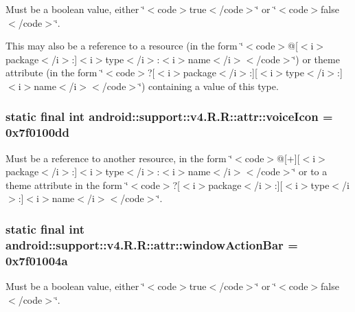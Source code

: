Must be a boolean value, either \char`\"{}$<$code$>$true$<$/code$>$\char`\"{} or \char`\"{}$<$code$>$false$<$/code$>$\char`\"{}. 

This may also be a reference to a resource (in the form \char`\"{}$<$code$>$@\mbox{[}$<$i$>$package$<$/i$>$:\mbox{]}$<$i$>$type$<$/i$>$:$<$i$>$name$<$/i$>$$<$/code$>$\char`\"{}) or theme attribute (in the form \char`\"{}$<$code$>$?\mbox{[}$<$i$>$package$<$/i$>$:\mbox{]}\mbox{[}$<$i$>$type$<$/i$>$:\mbox{]}$<$i$>$name$<$/i$>$$<$/code$>$\char`\"{}) containing a value of this type. \hypertarget{classandroid_1_1support_1_1v4_1_1_r_1_1attr_a308d75d002b6dfb8d612ca7faf303db}{
\subsubsection[{voiceIcon}]{\setlength{\rightskip}{0pt plus 5cm}static final int android::support::v4.R.R::attr::voiceIcon = 0x7f0100dd}}
\label{classandroid_1_1support_1_1v4_1_1_r_1_1attr_a308d75d002b6dfb8d612ca7faf303db}


Must be a reference to another resource, in the form \char`\"{}$<$code$>$@\mbox{[}+\mbox{]}\mbox{[}$<$i$>$package$<$/i$>$:\mbox{]}$<$i$>$type$<$/i$>$:$<$i$>$name$<$/i$>$$<$/code$>$\char`\"{} or to a theme attribute in the form \char`\"{}$<$code$>$?\mbox{[}$<$i$>$package$<$/i$>$:\mbox{]}\mbox{[}$<$i$>$type$<$/i$>$:\mbox{]}$<$i$>$name$<$/i$>$$<$/code$>$\char`\"{}. \hypertarget{classandroid_1_1support_1_1v4_1_1_r_1_1attr_a50eb8340be48311419382e35ced28bd}{
\subsubsection[{windowActionBar}]{\setlength{\rightskip}{0pt plus 5cm}static final int android::support::v4.R.R::attr::windowActionBar = 0x7f01004a}}
\label{classandroid_1_1support_1_1v4_1_1_r_1_1attr_a50eb8340be48311419382e35ced28bd}


Must be a boolean value, either \char`\"{}$<$code$>$true$<$/code$>$\char`\"{} or \char`\"{}$<$code$>$false$<$/code$>$\char`\"{}. 

